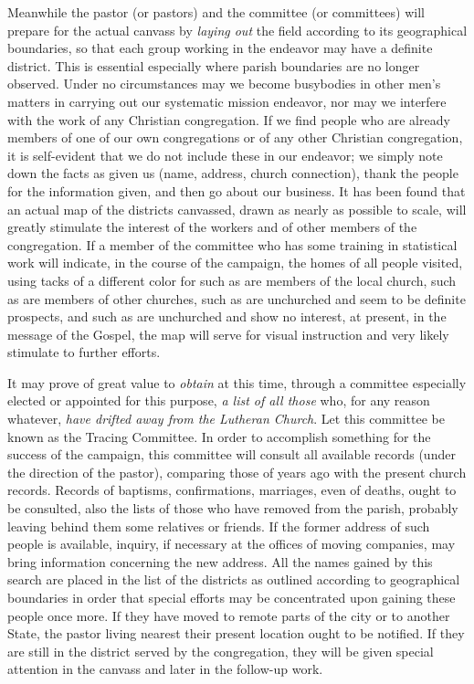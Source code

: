 \documentclass[
]{book}
\begin{document}
Meanwhile the pastor (or pastors) and the committee (or committees) will prepare for the actual canvass by \emph{laying out} the field according to its geographical boundaries, so that each group working in the endeavor may have a definite district. This is essential especially where parish boundaries are no longer observed. Under no circumstances may we become busybodies in other men's matters in carrying out our systematic mission endeavor, nor may we interfere with the work of any Christian congregation. If we find people who are already members of one of our own congregations or of any other Christian congregation, it is self-evident that we do not include these in our endeavor; we simply note down the facts as given us (name, address, church connection), thank the people for the information given, and then go about our business. It has been found that an actual map of the districts canvassed, drawn as nearly as possible to scale, will greatly stimulate the interest of the workers and of other members of the congregation. If a member of the committee who has some training in statistical work will indicate, in the course of the campaign, the homes of all people visited, using tacks of a different color for such as are members of the local church, such as are members of other churches, such as are unchurched and seem to be definite prospects, and such as are unchurched and show no interest, at present, in the message of the Gospel, the map will serve for visual instruction and very likely stimulate to further efforts.

It may prove of great value to \emph{obtain} at this time, through a committee especially elected or appointed for this purpose, \emph{a list of all those} who, for any reason whatever, \emph{have drifted away from the Lutheran Church}. Let this committee be known as the Tracing Committee. In order to accomplish something for the success of the campaign, this committee will consult all available records (under the direction of the pastor), comparing those of years ago with the present church records. Records of baptisms, confirmations, marriages, even of deaths, ought to be consulted, also the lists of those who have removed from the parish, probably leaving behind them some relatives or friends. If the former address of such people is available, inquiry, if necessary at the offices of moving companies, may bring information concerning the new address. All the names gained by this search are placed in the list of the districts as outlined according to geographical boundaries in order that special efforts may be concentrated upon gaining these people once more. If they have moved to remote parts of the city or to another State, the pastor living nearest their present location ought to be notified. If they are still in the district served by the congregation, they will be given special attention in the canvass and later in the follow-up work.
\end{document}
